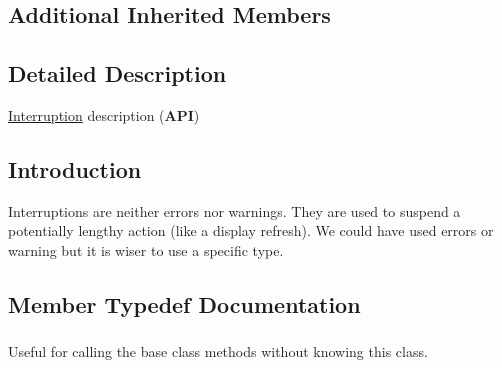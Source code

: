 \subsection*{Additional Inherited Members}


\subsection{Detailed Description}
\hyperlink{classHurricane_1_1Interruption}{Interruption} description ({\bfseries A\-P\-I}) 

\hypertarget{classHurricane_1_1Interruption_secInterruptionIntro}{}\subsection{Introduction}\label{classHurricane_1_1Interruption_secInterruptionIntro}
Interruptions are neither errors nor warnings. They are used to suspend a potentially lengthy action (like a display refresh). We could have used errors or warning but it is wiser to use a specific type. 

\subsection{Member Typedef Documentation}
\hypertarget{classHurricane_1_1Interruption_a47ecad9b4b2bd34a21de4a0d6fdf1f5d}{
\subsubsection[{Inherit}]{}}\label{classHurricane_1_1Interruption_a47ecad9b4b2bd34a21de4a0d6fdf1f5d}
Useful for calling the base class methods without knowing this class. 

